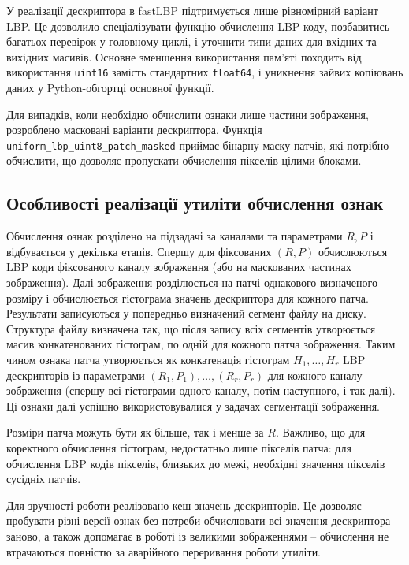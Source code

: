 У реалізації дескриптора в fastLBP підтримується лише рівномірний варіант LBP.
Це дозволило спеціалізувати функцію обчислення LBP коду, позбавитись багатьох перевірок у головному циклі, і уточнити типи даних для вхідних та вихідних масивів.
Основне зменшення використання пам'яті походить від використання \verb|uint16| замість стандартних \verb|float64|, 
і уникнення зайвих копіювань даних у Python-обгортці основної функції.

Для випадків, коли необхідно обчислити ознаки лише частини зображення, розроблено масковані варіанти дескриптора. 
Функція \verb|uniform_lbp_uint8_patch_masked| приймає бінарну маску патчів, які потрібно обчислити, що дозволяє пропускати обчислення пікселів цілими блоками. 

\subsection{Особливості реалізації утиліти обчислення ознак}\label{section2.2c}\hfill

Обчислення ознак розділено на підзадачі за каналами та параметрами $R,P$ і відбувається у декілька етапів.
Спершу для фіксованих $(R,P)$ обчислюються LBP коди фіксованого каналу зображення (або на маскованих частинах зображення).
Далі зображення розділюється на патчі однакового визначеного розміру і обчислюється гістограма значень дескриптора для кожного патча.
Результати записуються у попередньо визначений сегмент файлу на диску.
Структура файлу визначена так, що після запису всіх сегментів утворюється масив конкатенованих гістограм, по одній для кожного патча зображення.
Таким чином ознака патча утворюється як конкатенація гістограм $H_1,\dots ,H_r$ LBP дескрипторів із параметрами $(R_1,P_1),\dots ,(R_r,P_r)$ для кожного каналу зображення 
(спершу всі гістограми одного каналу, потім наступного, і так далі).
Ці ознаки далі успішно використовувалися у задачах сегментації зображення.

Розміри патча можуть бути як більше, так і менше за $R$.
Важливо, що для коректного обчислення гістограм, недостатньо лише пікселів патча: 
для обчислення LBP кодів пікселів, близьких до межі, необхідні значення пікселів сусідніх патчів.

Для зручності роботи реалізовано кеш значень дескрипторів. 
Це дозволяє пробувати різні версії ознак без потреби обчислювати всі значення дескриптора заново, 
а також допомагає в роботі із великими зображеннями -- обчислення не втрачаються повністю за аварійного переривання роботи утиліти.

